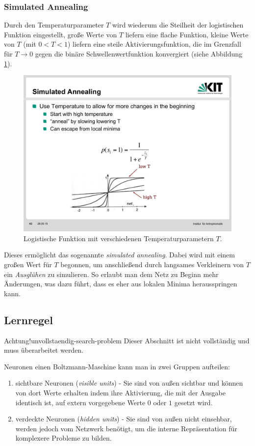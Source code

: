 \subsubsection*{Simulated Annealing}
Durch den Temperaturparameter $T$ wird wiederum die Steilheit der logistischen Funktion eingestellt, große Werte von $T$ liefern eine flache Funktion, kleine Werte von $T$ (mit $0 < T < 1$) liefern eine steile Aktivierungsfunktion, die im Grenzfall für $T \rightarrow 0$ gegen die binäre Schwellenwertfunktion konvergiert (siehe Abbildung \ref{fig:ch10_annealing}).

\begin{figure}[ht!] \centering 
	\includegraphics[width=0.7\linewidth]{figures/ch10_annealing.pdf}
	\caption{Logistische Funktion mit verschiedenen Temperaturparametern $T$.}
	\label{fig:ch10_annealing}
\end{figure}

Dieses ermöglicht das sogenannte \emph{simulated annealing}. Dabei wird mit einem großen Wert für $T$ begonnen, um anschließend durch langsames Verkleinern von $T$ ein \emph{Ausglühen} zu simulieren.
So erlaubt man dem Netz zu Beginn mehr Änderungen, was dazu führt, dass es eher aus lokalen Minima herausspringen kann.


\subsection*{Lernregel}
\begin{hint}{Achtung!}{unvollstaendig-search-problem}
	Dieser Abschnitt ist nicht vollständig und muss überarbeitet werden.
\end{hint}
Neuronen einen Boltzmann-Maschine kann man in zwei Gruppen aufteilen:
\begin{enumerate}
	\item sichtbare Neuronen (\emph{visible units}) - Sie sind von außen sichtbar und können von dort Werte erhalten indem ihre Aktivierung, die mit der Ausgabe identisch ist, auf extern vorgegebene Werte $0$ oder $1$ gesetzt wird. 
	\item verdeckte Neuronen (\emph{hidden units}) - Sie sind von außen nicht einsehbar, werden jedoch vom Netzwerk benötigt, um die interne Repräsentation für komplexere Probleme zu bilden. 
\end{enumerate}

